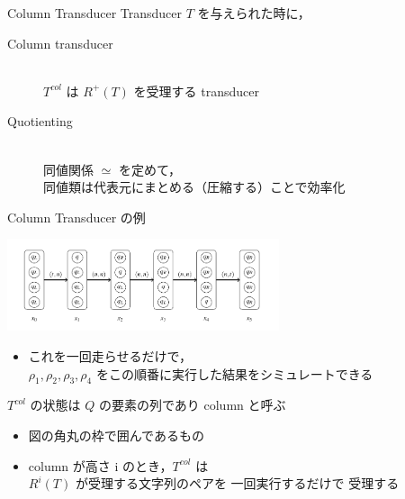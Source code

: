 \documentclass[presentation, xetex]{beamer}
\begin{document}
\begin{frame}[label={sec:org513c93d}]{Column Transducer}
Transducer \(T\) を与えられた時に，
\begin{description}
\item[{Column transducer}] \mbox{}\\
\(T^{col}\) は \(R^+(T)\) を受理する transducer
\item[{Quotienting}] \mbox{} \\
同値関係 \(\simeq\) を定めて， \\
同値類は代表元にまとめる（圧縮する）ことで効率化
\end{description}
\end{frame}


\begin{frame}[label={sec:org83d0a2b}]{Column Transducer の例}
\begin{center}
\includegraphics[width=0.6\textwidth]{./images/column-transducer.png}
\end{center}

\begin{itemize}
\item これを一回走らせるだけで， \\
\(\rho_1, \rho_2, \rho_3, \rho_4\) をこの順番に実行した結果をシミュレートできる
\end{itemize}


\(T^{col}\) の状態は \(Q\) の要素の列であり column と呼ぶ
\begin{itemize}
\item 図の角丸の枠で囲んであるもの
\item column が高さ i のとき，\(T^{col}\) は \\
\(R^i(T)\) が受理する文字列のペアを \alert{\alert{一回実行するだけで}} 受理する
\end{itemize}
\end{frame}
\end{document}
